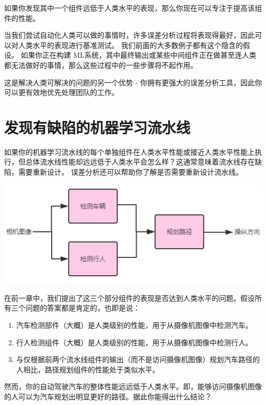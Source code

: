 如果你发现其中一个组件远低于人类水平的表现，那么你现在可以专注于提高该组件的性能。

当我们尝试自动化人类可以做的事情时，许多误差分析过程将表现得最好，因此可以对人类水平的表现进行基准测试。
我们前面的大多数例子都有这个隐含的假设。 如果你正在构建
ML系统，其中最终输出或某些中间组件正在做甚至连人类都无法做好的事情，那么这些过程中的一些步骤将不起作用。

这是解决人类可解决的问题的另一个优势 -
你拥有更强大的误差分析工具，因此你可以更有效地优先处理团队的工作。

\hypertarget{ux53d1ux73b0ux6709ux7f3aux9677ux7684ux673aux5668ux5b66ux4e60ux6d41ux6c34ux7ebf}{%
\chapter{发现有缺陷的机器学习流水线}\label{ux53d1ux73b0ux6709ux7f3aux9677ux7684ux673aux5668ux5b66ux4e60ux6d41ux6c34ux7ebf}}

如果你的机器学习流水线的每个单独组件在人类水平性能或接近人类水平性能上执行，但总体流水线性能却远远低于人类水平会怎么样？这通常意味着流水线存在缺陷，需要重新设计。
误差分析还可以帮助你了解是否需要重新设计流水线。

\includegraphics{./img/ch48_03.png}

在前一章中，我们提出了这三个部分组件的表现是否达到人类水平的问题。假设所有三个问题的答案都是肯定的，也即是说：

\begin{enumerate}
\def\labelenumi{\arabic{enumi}.}
\tightlist
\item
  汽车检测部件（大概）是人类级别的性能，用于从摄像机图像中检测汽车。
\item
  行人检测组件（大概）是人类级别的性能，用于从摄像机图像中检测行人。
\item
  与仅根据前两个流水线组件的输出（而不是访问摄像机图像）规划汽车路径的人相比，路径规划组件的性能处于类似水平。
\end{enumerate}

然而，你的自动驾驶汽车的整体性能远远低于人类水平。即，能够访问摄像机图像的人可以为汽车规划出明显更好的路径。据此你能得出什么结论？

